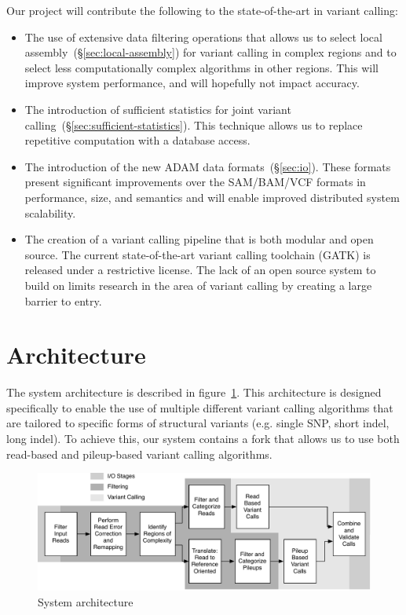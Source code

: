 \documentclass[11pt]{article}
\begin{document}
Our project will contribute the following to the state-of-the-art in variant calling:

\begin{itemize}
\item The use of extensive data filtering operations that allows us to select local assembly~(\S\ref{sec:local-assembly}) for
variant calling in complex regions and to select less computationally complex algorithms in other regions. This will improve
system performance, and will hopefully not impact accuracy.
\item The introduction of sufficient statistics for joint variant calling~(\S\ref{sec:sufficient-statistics}). This technique allows
us to replace repetitive computation with a database access.
\item The introduction of the new ADAM data formats~(\S\ref{sec:io}). These formats present significant improvements over the
SAM/BAM/VCF formats in performance, size, and semantics and will enable improved distributed system scalability.
\item The creation of a variant calling pipeline that is both modular and open source. The current state-of-the-art variant calling
toolchain (GATK) is released under a restrictive license. The lack of an open source system to build on limits research in the area
of variant calling by creating a large barrier to entry.
\end{itemize}

\section{Architecture}
\label{sec:architecture}

The system architecture is described in figure~\ref{fig:architecture}. This architecture is designed specifically to enable
the use of multiple different variant calling algorithms that are tailored to specific forms of structural variants (e.g. single
SNP, short indel, long indel). To achieve this, our system contains a fork that allows us to use both read-based and
pileup-based variant calling algorithms.

\begin{figure}[h]
\begin{center}
\includegraphics[width=0.9\linewidth]{avocado-architecture.pdf}
\end{center}
\caption{System architecture}
\label{fig:architecture}
\end{figure}
\end{document}
